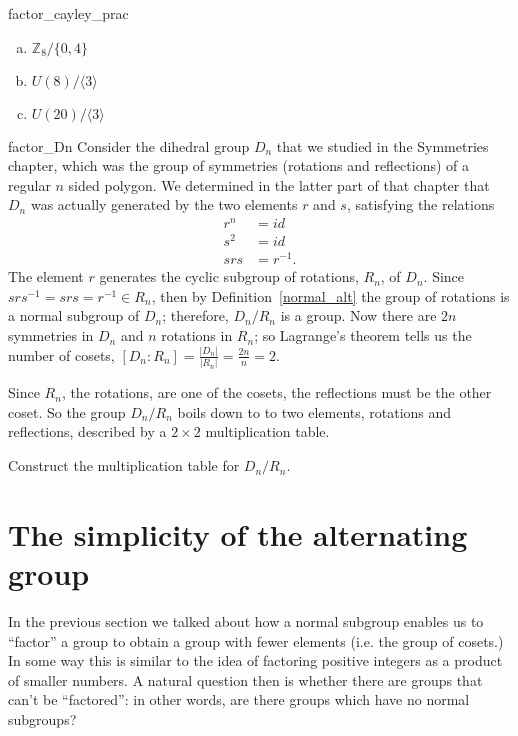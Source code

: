 {\begin{exercise}{factor_cayley_prac}
\begin{multicols}{2}
\begin{enumerate}[(a)]
\item
${\mathbb Z}_{8} / \{0,4\}$
\item
$U(8) / \langle 3 \rangle$
\item
$U(20) / \langle 3 \rangle$

\end{enumerate}
\end{multicols}
\end{exercise}
 
\begin{example}{factor_Dn}
Consider the dihedral group $D_n$ that we studied in the Symmetries chapter, which was the group of symmetries (rotations and reflections) of a regular $n$ sided polygon.  We determined in the latter part of that chapter that $D_n$ was actually generated by the two elements $r$ and $s$, satisfying the relations 
\begin{align*}
r^n & = id \\
s^2 & = id \\
srs & = r^{-1}.
\end{align*}
The element $r$ generates the cyclic subgroup of rotations,
$R_n$, of $D_n$.  Since $srs^{-1} = srs = r^{-1} \in R_n$, then by Definition~\ref{normal_alt} the group
of rotations is a normal subgroup of $D_n$; therefore, $D_n / R_n$ is
a group.  Now there are $2n$ symmetries in $D_n$ and $n$ rotations in $R_n$; so Lagrange's theorem tells us the number of cosets, $[D_n : R_n] =  \frac{|D_n|}{|R_n|} = \frac{2n}{n} =2$.  

Since $R_n$, the rotations, are one of the cosets, the reflections must be the other coset.  So the group $D_n / R_n$ boils down to to two elements, rotations and reflections, described by a $2 \times 2$ multiplication table.  
\end{example}

\begin{exercise}{}
Construct the multiplication table for  $D_n / R_n$. 
\end{exercise}


 
\section{The simplicity of the alternating group}\label{normal:section:simplealternating}
 
 In the previous section we talked about how a normal subgroup enables us to ``factor'' a group to obtain a group with fewer elements (i.e. the group of cosets.)  In some way this is similar to the idea of factoring positive integers as a product of smaller numbers.  A natural question then is whether there are groups that can't be ``factored'': in other words, are there groups which have no normal subgroups? 

}
